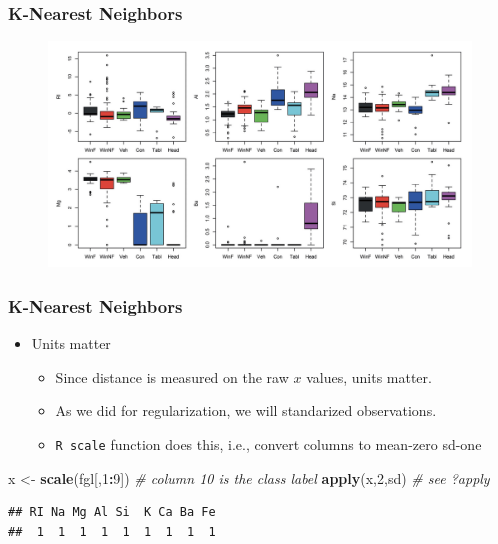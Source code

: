\documentclass[
  shownotes,
  xcolor={svgnames},
  hyperref={colorlinks,citecolor=DarkBlue,linkcolor=DarkRed,urlcolor=DarkBlue}
  , aspectratio=169]{beamer}
\newenvironment{Shaded}{\begin{snugshade}}{\end{snugshade}}
\newcommand{\CommentTok}[1]{\textcolor[rgb]{0.56,0.35,0.01}{\textit{#1}}}
\newcommand{\DecValTok}[1]{\textcolor[rgb]{0.00,0.00,0.81}{#1}}
\newcommand{\KeywordTok}[1]{\textcolor[rgb]{0.13,0.29,0.53}{\textbf{#1}}}
\newcommand{\NormalTok}[1]{#1}
\newcommand{\OperatorTok}[1]{\textcolor[rgb]{0.81,0.36,0.00}{\textbf{#1}}}
\newcommand{\StringTok}[1]{\textcolor[rgb]{0.31,0.60,0.02}{#1}}
\begin{document}
\begin{frame}[fragile]
\frametitle{K-Nearest Neighbors}


        \begin{figure}[H] \centering
            \captionsetup{justification=centering}
              \includegraphics[scale=0.15]{figures/glass}
              
 \end{figure}


\end{frame}
\begin{frame}[fragile]
\frametitle{K-Nearest Neighbors}

\begin{itemize}
  \item Units matter

\begin{itemize}
 \item Since distance is measured on the raw $x$ values, units matter.
 \item As we did for regularization, we will standarized observations.
 \item \texttt{R scale} function does this, i.e., convert columns to mean-zero sd-one
\end{itemize}
\end{itemize}
\bigskip
\begin{scriptsize}
\begin{Shaded}
\begin{Highlighting}[]
\NormalTok{x \textless{}{-}}\StringTok{ }\KeywordTok{scale}\NormalTok{(fgl[,}\DecValTok{1}\OperatorTok{:}\DecValTok{9}\NormalTok{]) }\CommentTok{\# column 10 is the class label}
\KeywordTok{apply}\NormalTok{(x,}\DecValTok{2}\NormalTok{,sd) }\CommentTok{\# see ?apply}
\end{Highlighting}
\end{Shaded}
\end{scriptsize}
\begin{tiny}
\begin{verbatim}
## RI Na Mg Al Si  K Ca Ba Fe 
##  1  1  1  1  1  1  1  1  1
\end{verbatim}
\end{tiny}
\end{frame}
\end{document}
